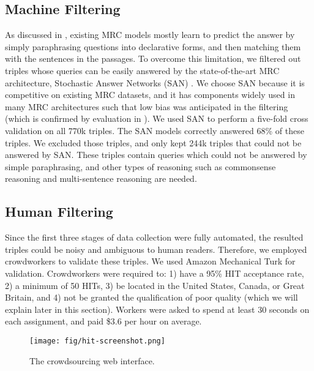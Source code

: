 \subsection{Machine Filtering}
As discussed in \citet{adversarial-squad,squad-v2,adversarial-training,how-much-reading},
existing MRC models mostly learn to predict the answer by simply paraphrasing questions into declarative forms, and then matching them with the sentences in the passages.
To overcome this limitation, we filtered out triples whose queries can be easily answered by
the state-of-the-art MRC architecture, Stochastic Answer Networks (SAN) \cite{san}.
We choose SAN because it is competitive on existing MRC datasets, and it has components widely used in many MRC architectures such that low bias was anticipated in the filtering (which is confirmed by evaluation in ). 
We used SAN to perform a five-fold cross validation on all 770k triples.
The SAN models correctly answered 68\% of these triples. 
We excluded those triples, and only kept 244k triples that could not be answered by SAN. 
These triples contain queries which could not be answered by simple paraphrasing, and other types of reasoning such as commonsense reasoning and multi-sentence reasoning are needed.

\subsection{Human Filtering}
\label{sec:human-filtering}
Since the first three stages of data collection were fully automated,
the resulted triples could be noisy and ambiguous to human readers.
Therefore, we employed crowdworkers to validate these triples.
We used Amazon Mechanical Turk for validation.
Crowdworkers were required to: 1) have a 95\% HIT acceptance rate, 2) a minimum of 50 HITs, 3) be located in the United States, Canada, or Great Britain, and 4) not be granted the qualification of poor quality (which we will explain later in this section).
Workers were asked to spend at least 30 seconds on each assignment, and paid \$3.6 per hour on average.

\begin{figure}[!ht]
\centering
\texttt{[image: fig/hit-screenshot.png]}
\caption{The crowdsourcing web interface.\label{fig:hit}}
\end{figure}

